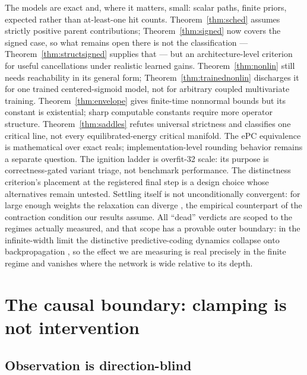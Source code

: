 \documentclass[11pt]{article}
\begin{document}
The models are exact and, where it matters, small: scalar paths, finite priors, expected
rather than at-least-one hit counts. Theorem~\ref{thm:sched} assumes strictly positive
parent contributions; Theorem~\ref{thm:signed} now covers the signed case, so what remains
open there is not the classification --- Theorem~\ref{thm:structsigned} supplies that ---
but an architecture-level criterion for useful cancellations under realistic learned
gains. Theorem~\ref{thm:nonlin} still needs reachability in its general form;
Theorem~\ref{thm:trainednonlin} discharges it for one trained centered-sigmoid model, not
for arbitrary coupled multivariate training. Theorem~\ref{thm:envelope} gives finite-time
nonnormal bounds but its constant is existential; sharp computable constants require more
operator structure. Theorem~\ref{thm:saddles} refutes universal strictness and classifies
one critical line, not every equilibrated-energy critical manifold. The ePC equivalence
is mathematical over exact reals; implementation-level rounding behavior remains a
separate question. The ignition ladder is overfit-32 scale: its purpose is
correctness-gated variant triage, not benchmark performance. The distinctness criterion's
placement at the registered final step is a design choice whose alternatives remain
untested. Settling itself is not unconditionally convergent: for large enough weights the
relaxation can diverge \cite{frieder2022}, the empirical counterpart of the contraction
condition our results assume. All ``dead'' verdicts are scoped to the regimes actually
measured, and that scope has a provable outer boundary: in the infinite-width limit the
distinctive predictive-coding dynamics collapse onto backpropagation \cite{innocenti2026},
so the effect we are measuring is real precisely in the finite regime and vanishes where
the network is wide relative to its depth.

\appendix

\section{The causal boundary: clamping is not intervention}

\subsection{Observation is direction-blind}
\end{document}
